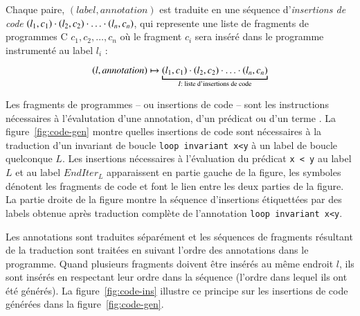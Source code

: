 Chaque paire, $(label, annotation)$ est traduite en une séquence
d'\emph{insertions de code}
$(l_1, c_1) \cdot (l_2, c_2) \cdot \ldots \cdot (l_n, c_n)$, qui 
represente une liste de fragments de programmes C $c_1, c_2, \ldots, c_n$ où
le fragment $c_i$ sera inséré dans le programme instrumenté au label $l_i$ :

\[
(l, annotation) \rulearrow \underbracket{(l_1, c_1) \concat (l_2, c_2) \concat
  \ldots \concat (l_n, c_n)}_{I : \text{ liste d'insertions de code}}
\]



Les fragments de programmes -- ou insertions de code -- sont les instructions
nécessaires à l'évalutation d'une annotation, d'un prédicat ou d'un terme
\eacsl.
La figure~\ref{fig:code-gen} montre quelles insertions de code sont nécessaires
à la traduction d'un invariant de boucle \lstinline'loop invariant x<y' à un
label de boucle quelconque $L$.
Les insertions nécessaires à l'évaluation du prédicat \lstinline'x < y' au
label $L$ et au label $EndIter_L$ apparaissent en partie gauche de la figure,
les symboles  dénotent les
fragments de code et font le lien entre les deux parties de la figure.
La partie droite de la figure montre la séquence d'insertions étiquettées par
des labels obtenue après traduction complète de l'annotation
\lstinline'loop invariant x<y'.



Les annotations \eacsl sont traduites séparément et les séquences de fragments
résultant de la traduction sont traitées en suivant l'ordre des annotations dans
le programme.
Quand plusieurs fragments doivent être insérés au même endroit $l$, ils sont
insérés en respectant leur ordre dans la séquence (l'ordre dans lequel ils ont
été générés).
La figure~\ref{fig:code-ins} illustre ce principe sur les insertions de code
générées dans la figure~\ref{fig:code-gen}.


